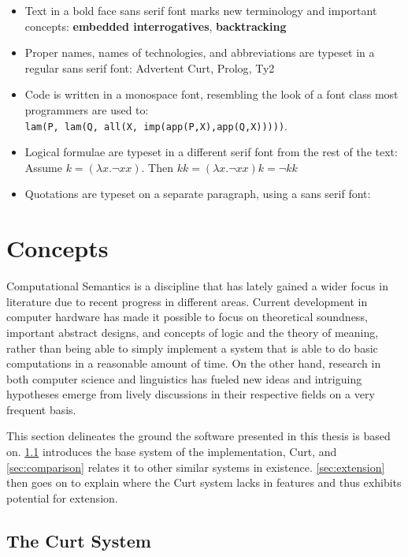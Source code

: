 \documentclass[a4paper]{article}
\newcommand{\term}[1]{\textsf{\textbf{#1}}} %
\newcommand{\code}[1]{\texttt{#1}} %
\newcommand{\pn}{\textsf} %
\newcommand{\quotesf}[1]{\quote{\textsf{#1}}}
\newcommand{\curt}{\pn{Curt}}
\newcommand{\acurt}{\pn{Advertent Curt}}
\newcommand{\prol}{\pn{Prolog}}
\theoremstyle{remark}
\theoremstyle{remark}
\theoremstyle{definition}
\theoremstyle{definition}
\begin{document}
\begin{itemize}
  \item Text in a bold face sans serif font marks new terminology and important
  concepts: \term{embedded interrogatives}, \term{backtracking}
  \item Proper names, names of technologies, and abbreviations are typeset in a
  regular sans serif font: \acurt, \prol, \pn{Ty2}
  \item Code is written in a monospace font, resembling the look of a font class most
  programmers are used to:\\
  \code{lam(P, lam(Q, all(X, imp(app(P,X),app(Q,X)))))}.
  \item Logical formulae are typeset in a different serif font from the rest of
  the text:\\
    Assume $k = (\lambda x.\neg xx)$. Then $ kk = (\lambda x .\neg xx)k = \neg kk$
  \item Quotations  are typeset on a separate paragraph, using a sans serif font:
  \quotesf{This answers the question!}
\end{itemize}


\section{Concepts}

Computational Semantics is a discipline that has  lately gained a wider focus in
literature due to recent progress in different areas.  Current development in
computer hardware has made it possible to focus on theoretical soundness,
important abstract designs, and concepts of logic and the theory of meaning,
rather than being able to simply implement a system that is able to do basic
computations in a reasonable amount of time. On the other hand, research in both
computer science and linguistics has fueled new ideas and intriguing hypotheses
emerge from lively discussions in their respective fields on a very frequent
basis.

This section delineates the ground the software presented in this thesis is
based on. \ref{sec:curt} introduces the base system of the implementation,
\curt{},
and \ref{sec:comparison} relates it to other similar systems in existence.
\ref{sec:extension} then goes on to explain where the \curt{} system lacks in
features and thus exhibits potential for extension.

\subsection{The Curt System} \label{sec:curt}
\end{document}
